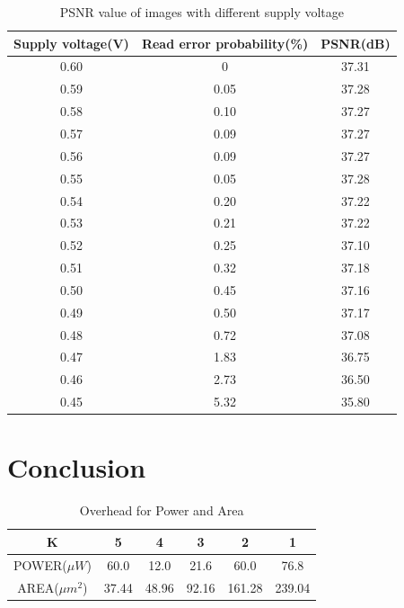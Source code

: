 \documentclass[lettersize,journal]{IEEEtran}
\begin{document}
\begin{table} 
\begin{center} 
\caption{PSNR value of images with different supply voltage} 
\label{tab1} 
\begin{tabular}{| c | c | c |} 
\hline 
Supply voltage(V) & Read error probability(\%) & 
PSNR(dB)\\
\hline 
0.60& 0 
& 37.31\\ 
\hline
0.59& 0.05 
& 37.28\\
\hline 
0.58& 0.10 
& 37.27\\ 
\hline
0.57& 0.09
& 37.27\\ 
\hline
0.56& 0.09 
& 37.27\\ 
\hline
0.55& 0.05 
& 37.28\\ 
\hline
0.54& 0.20 
& 37.22\\ 
\hline
0.53& 0.21 
& 37.22\\ 
\hline
0.52& 0.25 
& 37.10\\ 
\hline
0.51& 0.32 
& 37.18\\ 
\hline
0.50& 0.45 
& 37.16\\ 
\hline
0.49& 0.50 
& 37.17\\ 
\hline
0.48& 0.72 
& 37.08\\ 
\hline
0.47& 1.83 
& 36.75\\ 
\hline
0.46& 2.73 
& 36.50\\ 
\hline
0.45& 5.32 
& 35.80\\ 
\hline
\end{tabular} 
\end{center} 
\end{table}


\section{Conclusion} \label{sec5}

\begin{table} 
\begin{center} 
{\color{red}\caption{Overhead for Power and Area}} 
\label{tab2} 
\begin{tabular}{| c | c | c | c | c | c |} 
\hline 
K & 5 & 4 & 3 & 2 & 1 \\
\hline 
POWER($\mu W$)& 60.0 & 12.0 & 21.6 & 60.0 & 76.8 \\ 
\hline
AREA($\mu m^{2}$)& 37.44 & 48.96 & 92.16 & 161.28 & 239.04 \\
\hline 
\end{tabular} 
\end{center} 
\end{table}
\end{document}

